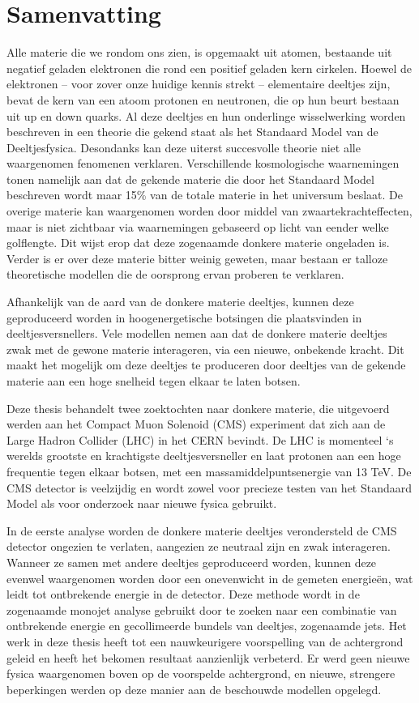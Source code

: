 
\chapter*{Samenvatting}

Alle materie die we rondom ons zien, is opgemaakt uit atomen, bestaande uit negatief geladen elektronen die rond een positief geladen kern cirkelen. Hoewel de elektronen – voor zover onze huidige kennis strekt – elementaire deeltjes zijn, bevat de kern van een atoom protonen en neutronen, die op hun beurt bestaan uit up en down quarks. Al deze deeltjes en hun onderlinge wisselwerking worden beschreven in een theorie die gekend staat als het Standaard Model van de Deeltjesfysica. Desondanks kan deze uiterst succesvolle theorie niet alle waargenomen fenomenen verklaren. Verschillende kosmologische waarnemingen tonen namelijk aan dat de gekende materie die door het Standaard Model beschreven wordt maar 15\% van de totale materie in het universum beslaat. De overige materie kan waargenomen worden door middel van  zwaartekrachteffecten, maar is niet zichtbaar via waarnemingen gebaseerd op licht van eender welke golflengte. Dit wijst erop dat deze zogenaamde donkere materie ongeladen is. Verder is er over deze materie bitter weinig geweten, maar bestaan er talloze theoretische modellen die de oorsprong ervan proberen te verklaren.

Afhankelijk van de aard van de donkere materie deeltjes, kunnen deze geproduceerd worden in hoogenergetische botsingen die plaatsvinden in deeltjesversnellers. Vele modellen nemen aan dat de donkere materie deeltjes zwak met de gewone materie interageren, via een nieuwe, onbekende kracht. Dit maakt het mogelijk om deze deeltjes te produceren door deeltjes van de gekende materie aan een hoge snelheid tegen elkaar te laten botsen.

Deze thesis behandelt twee zoektochten naar donkere materie, die uitgevoerd werden aan het Compact Muon Solenoid (CMS) experiment dat zich aan de Large Hadron Collider (LHC) in het CERN bevindt. De LHC is momenteel ‘s werelds grootste en krachtigste deeltjesversneller en laat protonen aan een hoge frequentie tegen elkaar botsen, met een massamiddelpuntsenergie van 13 TeV. De CMS detector is veelzijdig en wordt zowel voor precieze testen van het Standaard Model als voor onderzoek naar nieuwe fysica gebruikt.

In de eerste analyse worden de donkere materie deeltjes verondersteld de CMS detector ongezien te verlaten, aangezien ze neutraal zijn en zwak interageren. Wanneer ze samen met andere deeltjes geproduceerd worden, kunnen deze evenwel waargenomen worden door een onevenwicht in de gemeten energieën, wat leidt tot ontbrekende energie in de detector. Deze methode wordt in de zogenaamde monojet analyse gebruikt door te zoeken naar een combinatie van ontbrekende energie en gecollimeerde bundels van deeltjes, zogenaamde jets. Het werk in deze thesis heeft tot een nauwkeurigere voorspelling van de achtergrond geleid en heeft het bekomen resultaat aanzienlijk verbeterd. Er werd geen nieuwe fysica waargenomen boven op de voorspelde achtergrond, en nieuwe, strengere beperkingen werden op deze manier aan de beschouwde modellen opgelegd.

